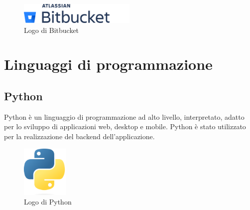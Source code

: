 \begin{figure}[h]
  \centering
  \includegraphics[width=0.5\textwidth]{img/tecnologie/bitbucket.png}
  \caption{Logo di Bitbucket}
  \label{fig:bitbucket}
\end{figure}

\section{Linguaggi di programmazione}
\subsection{Python}
Python è un linguaggio di programmazione ad alto livello, interpretato, adatto per lo sviluppo di applicazioni web, desktop e mobile. Python è stato utilizzato per la realizzazione del backend dell'applicazione.

\begin{figure}[h]
  \centering
  \includegraphics[width=0.2\textwidth]{img/tecnologie/python.png}
  \caption{Logo di Python}
  \label{fig:python}
\end{figure}